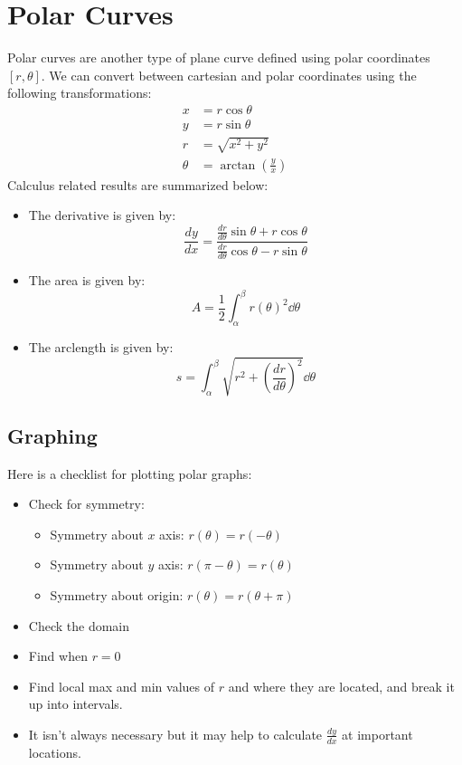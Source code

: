 \documentclass{article}
\begin{document}
    \section{Polar Curves}
    Polar curves are another type of plane curve defined using polar coordinates $[r, \theta]$. We can convert between cartesian and polar coordinates using the following transformations:
    \begin{align}
        x &= r\cos\theta \\ 
        y &= r\sin\theta \\ 
        r &= \sqrt{x^2+y^2} \\ 
        \theta &= \arctan\left(\frac{y}{x}\right)
    \end{align}
    Calculus related results are summarized below:
    \begin{itemize}
        \item The derivative is given by:
        \begin{equation}
            \frac{dy}{dx} = \frac{\frac{dr}{d\theta}\sin\theta + r\cos\theta}{\frac{dr}{d\theta}\cos\theta - r\sin\theta}
        \end{equation}
        \item The area is given by:
        \begin{equation}
            A = \frac{1}{2}\int_\alpha^\beta r(\theta)^2 \dd{\theta}
        \end{equation}
        \item The arclength is given by:
        \begin{equation}
            s = \int_\alpha^\beta \sqrt{r^2+\left(\frac{dr}{d\theta}\right)^2} \dd{\theta}
        \end{equation}
    \end{itemize}
    \subsection{Graphing}
    Here is a checklist for plotting polar graphs:
    \begin{itemize}
        \item Check for symmetry:
        \begin{itemize}
            \item Symmetry about $x$ axis: $r(\theta)=r(-\theta)$
            \item Symmetry about $y$ axis: $r(\pi-\theta) = r(\theta)$
            \item Symmetry about origin: $r(\theta) = r(\theta+\pi)$
        \end{itemize}
        \item Check the domain
        \item Find when $r=0$
        \item Find local max and min values of $r$ and where they are located, and break it up into intervals.
        \item It isn't always necessary but it may help to calculate $\frac{dy}{dx}$ at important locations.
    \end{itemize}
\end{document}
